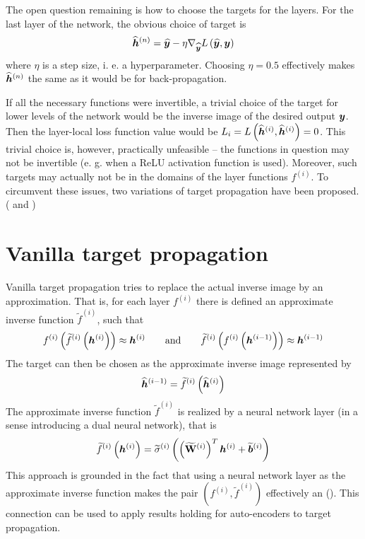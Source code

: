 The open question remaining is how to choose the targets for the layers. For the last layer of the network, the obvious choice of target is
\begin{equation}\label{targetprop_last_layer_target}
	\widehat{\bm{h}}^{(n)} = \widehat{\bm{y}} - \eta \nabla_{\widehat{\bm{y}}} L \left( \widehat{\bm{y}}, \bm{y} \right)
\end{equation}
where \( \eta \) is a step size, i. e. a hyperparameter. Choosing \( \eta = 0.5 \) effectively makes \( \widehat{\bm{h}}^{(n)} \) the same as it would be for back-propagation.

If all the necessary functions were invertible, a trivial choice of the target for lower levels of the network would be the inverse image of the desired output \( \bm{y} \). Then the layer-local loss function value would be \( L_i = L \left( \widehat{\bm{h}}^{(i)}, \widehat{\bm{h}}^{(i)} \right) = 0 \). This trivial choice is, however, practically unfeasible -- the functions in question may not be invertible (e. g. when a ReLU activation function is used). Moreover, such targets may actually not be in the domains of the layer functions \( f^{(i)} \). To circumvent these issues, two variations of target propagation have been proposed. (\cite{bengio_how_2014} and \cite{lee_difference_2015})

\section{Vanilla target propagation}

Vanilla target propagation tries to replace the actual inverse image by an approximation. That is, for each layer \( f^{(i)} \) there is defined an approximate inverse function \( \widetilde{f}^{(i)} \), such that
\[ f^{(i)} \left( \widetilde{f}^{(i)} \left( \bm{h}^{(i)} \right) \right) \approx \bm{h}^{(i)} \qquad \text{and} \qquad \widetilde{f}^{(i)} \left( f^{(i)} \left( \bm{h}^{(i - 1)} \right) \right) \approx \bm{h}^{(i - 1)} \]
The target can then be chosen as the approximate inverse image represented by
\[ \widehat{\bm{h}}^{(i - 1)} = \widetilde{f}^{(i)} \left( \widehat{\bm{h}}^{(i)} \right) \]
The approximate inverse function \( \widetilde{f}^{(i)} \) is realized by a neural network layer (in a sense introducing a dual neural network), that is
\[ \widetilde{f}^{(i)} \left( \bm{h}^{(i)} \right) = \widetilde{\sigma}^{(i)} \left( \left( {\widetilde{\mathbf{W}}}^{(i)} \right)^T \bm{h}^{(i)} + \widetilde{\bm{b}}^{(i)} \right) \]
This approach is grounded in the fact that using a neural network layer as the approximate inverse function makes the pair \( \left( f^{(i)}, \widetilde{f}^{(i)} \right) \) effectively an  (\cite{bourlard_auto-association_1988}). This connection can be used to apply results holding for auto-encoders to target propagation.

